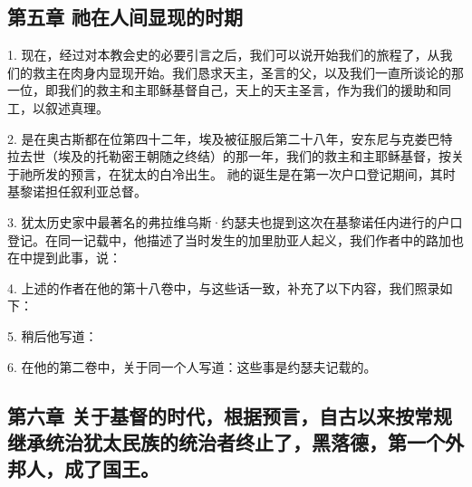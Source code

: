 
\subsection{第五章 祂在人间显现的时期}

1. 现在，经过对本教会史的必要引言之后，我们可以说开始我们的旅程了，从我们的救主在肉身内显现开始。我们恳求天主，圣言的父，以及我们一直所谈论的那一位，即我们的救主和主耶稣基督自己，天上的天主圣言，作为我们的援助和同工，以叙述真理。\par

2. 是在奥古斯都在位第四十二年，埃及被征服后第二十八年，安东尼与克娄巴特拉去世（埃及的托勒密王朝随之终结）的那一年，我们的救主和主耶稣基督，按关于祂所发的预言，在犹太的白冷出生。 祂的诞生是在第一次户口登记期间，其时基黎诺担任叙利亚总督。\par

3. 犹太历史家中最著名的弗拉维乌斯·约瑟夫也提到这次在基黎诺任内进行的户口登记。在同一记载中，他描述了当时发生的加里肋亚人起义，我们作者中的路加也在中提到此事，说：\par

4. 上述的作者在他的第十八卷中，与这些话一致，补充了以下内容，我们照录如下：\par

5. 稍后他写道：\par

6. 在他的第二卷中，关于同一个人写道：这些事是约瑟夫记载的。\par


\subsection{第六章 关于基督的时代，根据预言，自古以来按常规继承统治犹太民族的统治者终止了，黑落德，第一个外邦人，成了国王。}

